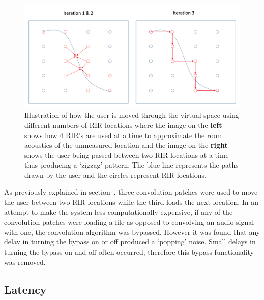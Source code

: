 \documentclass[../../main.tex]{subfiles}
\begin{document}
		\begin{figure}[H]
			\centerline{\includegraphics[scale = 0.4]{Sections/Implementation/Max/images/Max/iterationMovement.png}}
			\caption{Illustration of how the user is moved through the virtual space using different numbers of \ac{RIR} locations where the image on the \textbf{left} shows how 4 \ac{RIR}'s are used at a time to approximate the room acoustics of the unmeasured location and the image on the \textbf{right} shows the user being passed between two \ac{RIR} locations at a time thus producing a `zigzag' pattern. The blue line represents the paths drawn by the user and the circles represent \ac{RIR} locations.}
			\label{iterationMovement}
		\end{figure}



		As previously explained in section~, three convolution patches were used to move the user between two \ac{RIR} locations while the third loads the next location. In an attempt to make the system less computationally expensive, if any of the convolution patches were loading a file as opposed to convolving an audio signal with one, the convolution algorithm was bypassed. However it was found that any delay in turning the bypass on or off produced a `popping' noise. Small delays in turning the bypass on and off often occurred, therefore this bypass functionality was removed.


	\subsection{Latency}
		\label{max:latency}
\end{document}
